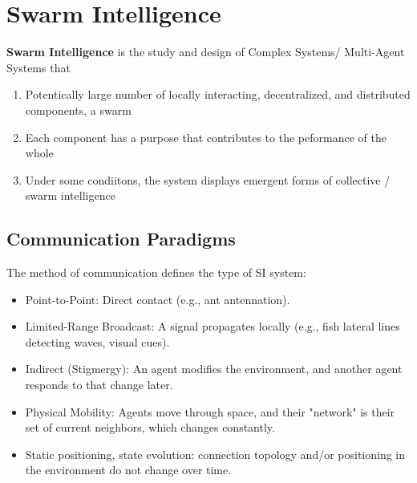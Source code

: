 \chapter*{Swarm Intelligence}

\textbf{Swarm Intelligence} is the study and design of Complex Systems/ 
Multi-Agent Systems that 
\begin{enumerate}
    \item Potentically large number of locally interacting, decentralized,
    and distributed components, a swarm 
    \item Each component has a purpose that contributes to the peformance of 
    the whole
    \item Under some condiitons, the system displays emergent forms of 
    collective / swarm intelligence
\end{enumerate}

\section*{Communication Paradigms}

The method of communication defines the type of SI system:

\begin{itemize}
    \item Point-to-Point: Direct contact (e.g., ant antennation).
    \item Limited-Range Broadcast: A signal propagates locally (e.g., fish lateral lines detecting waves, visual cues).
    \item Indirect (Stigmergy): An agent modifies the environment, and another agent responds to that change later.
    \item Physical Mobility: Agents move through space,
    and their "network" is their set of current neighbors, which changes constantly.
    \item Static positioning, state evolution: connection topology and/or 
    positioning in the environment do not change over time.
\end{itemize}
    
    